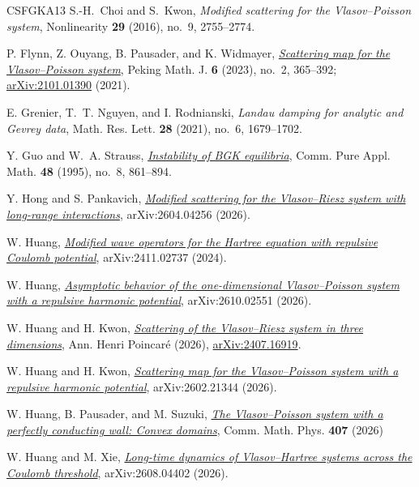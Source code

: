 \documentclass[10pt,reqno]{amsart}
\begin{document}
\begin{thebibliography}{CSFGKA13}
S.-H.~Choi and S.~Kwon,
\emph{Modified scattering for the Vlasov--Poisson system},
Nonlinearity \textbf{29} (2016), no.~9, 2755--2774.

P. Flynn, Z. Ouyang, B. Pausader, and K. Widmayer,
\href{https://doi.org/10.1007/s42543-021-00041-x}{\emph{Scattering map for the Vlasov--Poisson system}},
Peking Math. J. \textbf{6} (2023), no.~2, 365--392; \href{https://arxiv.org/abs/2101.01390}{arXiv:2101.01390} (2021).

E. Grenier, T.~T. Nguyen, and I. Rodnianski,
\emph{Landau damping for analytic and Gevrey data},
Math. Res. Lett. \textbf{28} (2021), no.~6, 1679--1702.

Y. Guo and W.~A. Strauss,
\href{https://onlinelibrary.wiley.com/doi/abs/10.1002/cpa.3160480803}{\emph{Instability of BGK equilibria}},
Comm. Pure Appl. Math. \textbf{48} (1995), no.~8, 861--894.

Y. Hong and S. Pankavich,
\href{https://arxiv.org/abs/2604.04256}{\emph{Modified scattering for the Vlasov--Riesz system with long-range interactions}},
arXiv:2604.04256 (2026).

W. Huang,
\href{https://arxiv.org/abs/2411.02737}{\emph{Modified wave operators for the Hartree equation with repulsive Coulomb potential}},
arXiv:2411.02737 (2024).

W. Huang,
\href{https://arxiv.org/abs/2610.02551}{\emph{Asymptotic behavior of the one-dimensional Vlasov--Poisson system with a repulsive harmonic potential}},
arXiv:2610.02551 (2026).

W. Huang and H. Kwon,
\href{https://link.springer.com/article/10.1007/s00023-026-01735-7}{\emph{Scattering of the Vlasov--Riesz system in three dimensions}},
Ann. Henri Poincar\'e (2026), \href{https://arxiv.org/abs/2407.16919}{arXiv:2407.16919}.

W. Huang and H. Kwon,
\href{https://arxiv.org/abs/2602.21344}{\emph{Scattering map for the Vlasov--Poisson system with a repulsive harmonic potential}},
arXiv:2602.21344 (2026).

W. Huang, B. Pausader, and M. Suzuki,
\href{https://arxiv.org/abs/2412.13434}{\emph{The Vlasov--Poisson system with a perfectly conducting wall: Convex domains}},
 Comm. Math. Phys. \textbf{407} (2026)

W. Huang and M. Xie,
\href{https://arxiv.org/abs/2608.04402}{\emph{Long-time dynamics of Vlasov--Hartree systems across the Coulomb threshold}},
arXiv:2608.04402 (2026).


\end{thebibliography}
\end{document}

